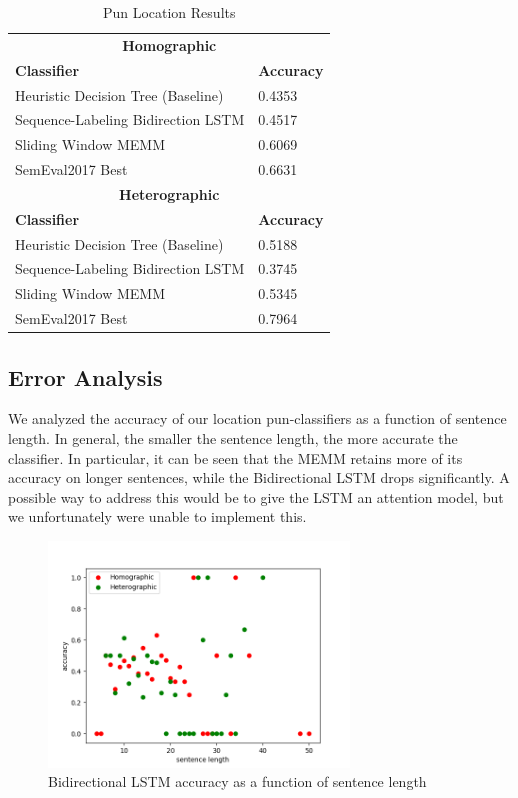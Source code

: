 \documentclass{article}
\begin{document}
\begin{table}
\caption{Pun Location Results}\label{tab:pun_location_results}
\begin{center}
\begin{tabular}{l l} 
\toprule
\multicolumn{2}{c}{\textbf{Homographic}}\\
\textbf{Classifier}					& \textbf{Accuracy}\\
Heuristic Decision Tree (Baseline)	& 0.4353\\
Sequence-Labeling Bidirection LSTM	& 0.4517\\
Sliding Window MEMM					& 0.6069\\
SemEval2017 Best					& 0.6631\\
\midrule
\multicolumn{2}{c}{\textbf{Heterographic}}\\
\textbf{Classifier}					& \textbf{Accuracy}\\
Heuristic Decision Tree (Baseline)	& 0.5188\\
Sequence-Labeling Bidirection LSTM	& 0.3745\\
Sliding Window MEMM					& 0.5345\\
SemEval2017 Best					& 0.7964\\
\bottomrule
\end{tabular}
\end{center}
\end{table}

\subsection{Error Analysis}

We analyzed the accuracy of our location pun-classifiers as a function of
sentence length. In general, the smaller the sentence length, the more accurate
the classifier. In particular, it can be seen that the MEMM retains more of its
accuracy on longer sentences, while the Bidirectional LSTM drops significantly. 
A possible way to address this would be to give the LSTM an attention model, but
we unfortunately were unable to implement this.

\begin{figure}[h!]
    \centering
    \includegraphics[width=8cm]{figures/location-rnn.png}
	\caption{Bidirectional LSTM accuracy as a function of sentence length}
    \label{fig:method}
\end{figure}
\end{document}
